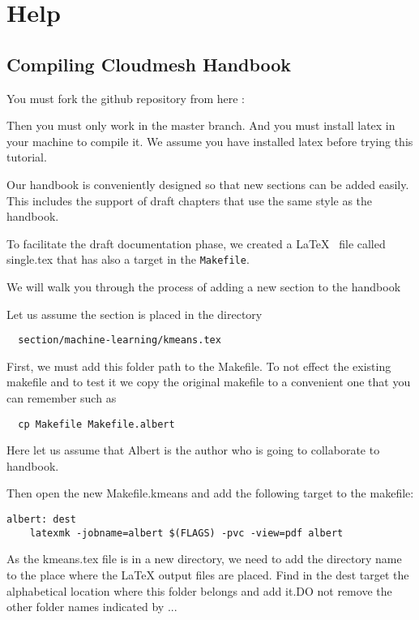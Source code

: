 \chapter{Help}

\section{Compiling Cloudmesh Handbook}\label{s:help-compile-handbook}

You must fork the github repository from here :

Then you must only work in the master branch.  And you must install
latex in your machine to compile it. We assume you have installed
latex before trying this tutorial.

Our handbook is conveniently designed so that new sections can be
added easily. This includes the support of draft chapters that use the
same style as the handbook.

To facilitate the draft documentation phase, we created a \LaTeX~ file
called single.tex that has also a target in the \verb|Makefile|.

We will walk you through the process of adding a new section to the handbook

Let us assume the section is placed in the directory

\begin{lstlisting}
  section/machine-learning/kmeans.tex 
\end{lstlisting}

First, we must add this folder path to the Makefile. To not effect the
existing makefile and to test it we copy the original makefile to a
convenient one that you can remember such as

\begin{lstlisting}
  cp Makefile Makefile.albert
\end{lstlisting}

Here let us assume that Albert is the author who is going to
collaborate to handbook.

Then open the new Makefile.kmeans and add the following target to the
makefile:

\begin{lstlisting}
albert: dest 
	latexmk -jobname=albert $(FLAGS) -pvc -view=pdf albert
\end{lstlisting}  

As the kmeans.tex file is in a new directory, we need to add the
directory name to the place where the LaTeX output files are placed.
Find in the dest target the alphabetical location where  this folder
belongs and add it.DO not remove the other folder names indicated by
...


